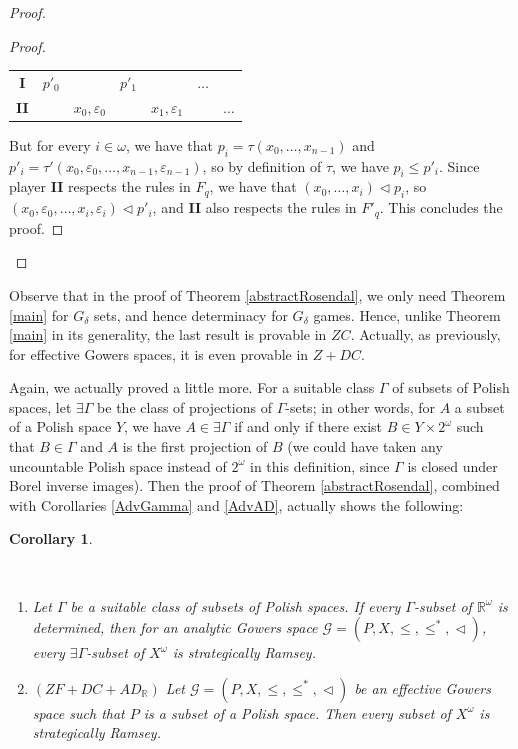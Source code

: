 \documentclass[a4paper,11pt]{article}
\makeatletter
\newtheorem{cor}[thm]{Corollary}
\theoremstyle{definition}
\numberwithin{equation}{section}
\newcommand{\R}{\mathbb{R}}
\newcommand{\G}{\mathcal{G}}
\newcommand{\II}{\textbf{II}}
\newcommand{\alaligne}{~\vspace*{\topsep}\nobreak\@afterheading}
\makeatother
\begin{document}
\begin{proof}
\begin{proof}
\smallskip

\begin{tabular}{ccccccc}
\textbf{I} & $p'_0$ & & $p'_1$ & & $\hdots$ & \\
\textbf{II} & & $x_0, \varepsilon_0$ & & $x_1, \varepsilon_1$ & & $\hdots$ 
\end{tabular}

\smallskip

\noindent But for every $i \in \omega$, we have that $p_i = \tau(x_0, \ldots, x_{n - 1})$ and $p'_i = \tau'(x_0, \varepsilon_0, \ldots, x_{n - 1}, \varepsilon_{n - 1})$, so by definition of $\tau$, we have $p_i \leqslant p'_i$. Since player \II{} respects the rules in $F_q$, we have that $(x_0, \ldots, x_i) \vartriangleleft p_i$, so $(x_0, \varepsilon_0, \ldots, x_i, \varepsilon_i) \vartriangleleft p'_i$, and \II{} also respects the rules in $F'_q$. This concludes the proof.

\end{proof}

\end{proof}

Observe that in the proof of Theorem \ref{abstractRosendal}, we only need Theorem \ref{main} for $G_\delta$ sets, and hence determinacy for $G_\delta$ games. Hence, unlike Theorem \ref{main} in its generality, the last result is provable in $ZC$. Actually, as previously, for effective Gowers spaces, it is even provable in $Z + DC$.

\smallskip

Again, we actually proved a little more. For a suitable class $\Gamma$ of subsets of Polish spaces, let $\exists\Gamma$ be the class of projections of $\Gamma$-sets; in other words, for $A$ a subset of a Polish space $Y$, we have $A \in \exists\Gamma$ if and only if there exist $B \in Y \times 2^\omega$ such that $B \in \Gamma$ and $A$ is the first projection of $B$ (we could have taken any uncountable Polish space instead of $2^\omega$ in this definition, since $\Gamma$ is closed under Borel inverse images). Then the proof of Theorem \ref{abstractRosendal}, combined with Corollaries \ref{AdvGamma} and \ref{AdvAD}, actually shows the following:

\begin{cor}\label{StratGamma}

\alaligne

\begin{enumerate}

\item Let $\Gamma$ be a suitable class of subsets of Polish spaces. If every $\Gamma$-subset of $\R^\omega$ is determined, then for an analytic Gowers space $\G = (P, X, \leqslant, \leqslant^*, \vartriangleleft)$, every $\exists\Gamma$-subset of $X^\omega$ is strategically Ramsey.

\item $(ZF + DC + AD_\R)$ Let $\G = (P, X, \leqslant, \leqslant^*, \vartriangleleft)$ be an effective Gowers space such that $P$ is a subset of a Polish space. Then every subset of $X^\omega$ is strategically Ramsey.

\end{enumerate}

\end{cor}
\end{document}
